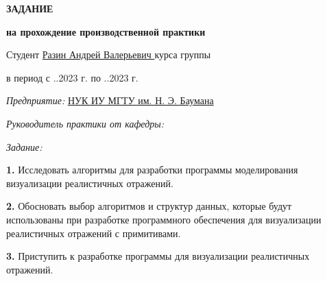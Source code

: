 \begin{center}\linespread{1}\selectfont
    \Large{\textbf{ЗАДАНИЕ}}

    \large{\textbf{на прохождение производственной практики}}

    \large{}
\end{center}

\fontsize{14pt}{14pt}\selectfont

\noindent Студент \uline{\hfill Разин Андрей Валерьевич \hfill}  курса группы 

\vspace{0.3cm}

\noindent в период с ..2023 г. по ..2023 г.

\vspace{0.3cm}

\noindent \textit{Предприятие:} \uline{\hfill НУК ИУ МГТУ им. Н. Э. Баумана \hfill}

\vspace{0.3cm}






\noindent \textit{Руководитель практики от кафедры:}

\noindent {}

\vspace{0.3cm}

\noindent \textit{Задание:}

\noindent \textbf{1.} Исследовать алгоритмы для разработки программы моделирования визуализации реалистичных отражений.

\noindent \textbf{2.} Обосновать выбор алгоритмов и структур данных, которые будут использованы при разработке программного обеспечения для визуализации реалистичных отражений с примитивами.

\noindent \textbf{3.} Приступить к разработке программы для визуализации реалистичных отражений.


